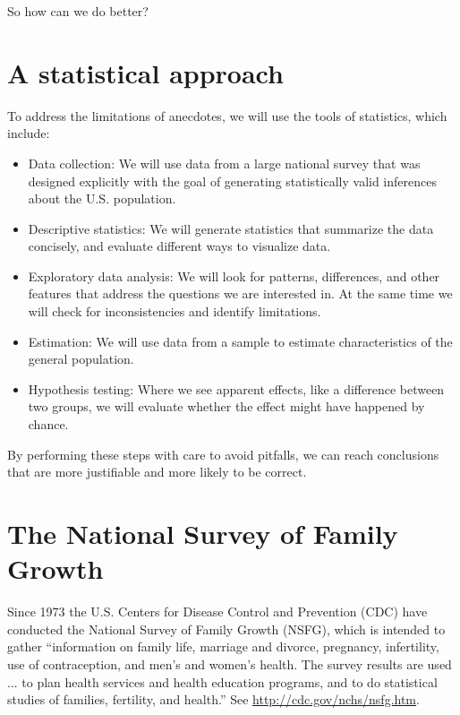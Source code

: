 \documentclass[12pt]{book}
\begin{document}
So how can we do better?


\section{A statistical approach}

To address the limitations of anecdotes, we will use the tools
of statistics, which include:

\begin{itemize}

\item Data collection: We will use data from a large national survey
  that was designed explicitly with the goal of generating
  statistically valid inferences about the U.S. population.

\item Descriptive statistics: We will generate statistics that
  summarize the data concisely, and evaluate different ways to
  visualize data.

\item Exploratory data analysis: We will look for
  patterns, differences, and other features that address the questions
  we are interested in.  At the same time we will check for
  inconsistencies and identify limitations.

\item Estimation: We will use data from a sample to estimate
  characteristics of the general population.

\item Hypothesis testing: Where we see apparent effects, like a
  difference between two groups, we will evaluate whether the effect
  might have happened by chance.

\end{itemize}

By performing these steps with care to avoid pitfalls, we can
reach conclusions that are more justifiable and more likely to be
correct.


\section{The National Survey of Family Growth}
\label{nsfg}

Since 1973 the U.S. Centers for Disease Control and Prevention (CDC)
have conducted the National Survey of Family Growth (NSFG),
which is intended to gather ``information on family life, marriage and
divorce, pregnancy, infertility, use of contraception, and men's and
women's health. The survey results are used ... to plan health services and
health education programs, and to do statistical studies of families,
fertility, and health.''  See
  \url{http://cdc.gov/nchs/nsfg.htm}.
\end{document}
